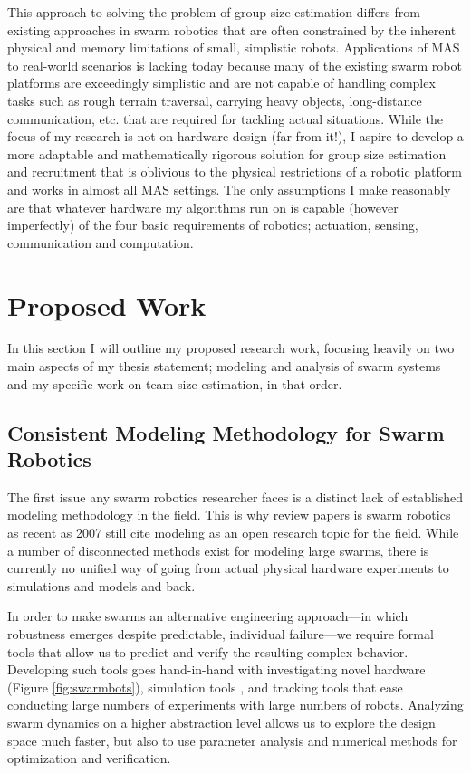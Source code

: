 \documentclass[11pt, onecolumn, compsoc, letterpaper]{article}
\begin{document}
This approach to solving the problem of group size estimation differs from existing approaches in swarm robotics that are often constrained by the inherent physical and memory limitations of small, simplistic robots. Applications of MAS to real-world scenarios is lacking today because many of the existing swarm robot platforms are exceedingly simplistic and are not capable of handling complex tasks such as rough terrain traversal, carrying heavy objects, long-distance communication, etc. that are required for tackling actual situations. While the focus of my research is not on hardware design (far from it!), I aspire to develop a more adaptable and mathematically rigorous solution for group size estimation and recruitment that is oblivious to the physical restrictions of a robotic platform and works in almost all MAS settings. The only assumptions I make reasonably are that whatever hardware my algorithms run on is capable (however imperfectly) of the four basic requirements of robotics; actuation, sensing, communication and computation.

\section{Proposed Work}
In this section I will outline my proposed research work, focusing heavily on two main aspects of my thesis statement; modeling and analysis of swarm systems and my specific work on team size estimation, in that order.

\subsection{Consistent Modeling Methodology for Swarm Robotics}
The first issue any swarm robotics researcher faces is a distinct lack of established modeling methodology in the field.  This is why review papers is swarm robotics as recent as 2007 \cite{Bayindir2007} still cite modeling as an open research topic for the field. While a number of disconnected methods exist for modeling large swarms, there is currently no unified way of going from actual physical hardware experiments to simulations and models and back. 

In order to make swarms an alternative engineering approach---in which robustness emerges despite predictable, individual failure---we require formal tools that allow us to predict and verify the resulting complex behavior. Developing such tools goes hand-in-hand with investigating novel hardware (Figure \ref{fig:swarmbots}), simulation tools \cite{Michel1998}, and tracking tools \cite{correlliros06,lochmatter08} that ease conducting large numbers of experiments with large numbers of robots. Analyzing swarm dynamics on a higher abstraction level allows us to explore the design space much faster, but also to use parameter analysis and numerical methods for optimization and verification.
\end{document}
